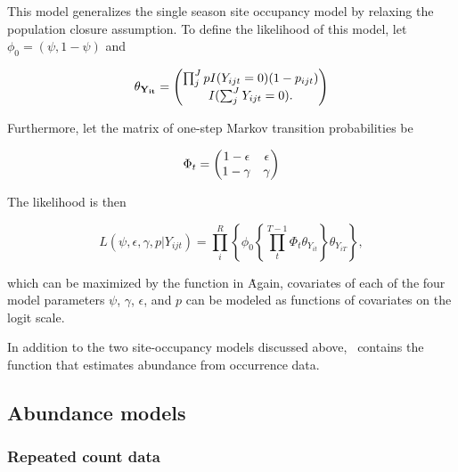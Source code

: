 \documentclass[article,shortnames]{jss}
\newcommand{\um}{\pkg{unmarked}}
\begin{document}
This model generalizes the single season site occupancy model by relaxing the 
population closure assumption. To define the likelihood of this model, 
let $\phi_0 = (\psi, 1-\psi)$ and 

\begin{equation}
  \theta_{{\bf Y_{it}}} =
  \begin{pmatrix}
    \prod_{j}^{J} p I(Y_{ijt}=0)(1-p_{ijt}) \\
    I(\sum_{j}^{J} Y_{ijt}=0). \notag\\
  \end{pmatrix}
\end{equation}

Furthermore, let  the matrix of one-step Markov transition probabilities be 

\begin{equation}
  \Phi_t =
  \begin{pmatrix}
    1-\epsilon & \epsilon \\
    1-\gamma & \gamma \notag\\
  \end{pmatrix}
\end{equation}

The likelihood is then

\begin{equation}
L(\psi,\epsilon,\gamma,p | Y_{ijt}) = 
 \prod_{i}^{R} \left\{
    \phi_0 \left\{ \prod_{t}^{T-1} \Phi_t \theta_{Y_{it}}  
        \right\} \theta_{Y_{iT}} \right\},
\end{equation}

which can be maximized by the  function in \um\. Again, 
covariates of each of the four model parameters $\psi$, $\gamma$, 
$\epsilon$, and $p$ can be modeled as functions of covariates on the logit 
scale. 

In addition to the two site-occupancy models discussed above, \um\ contains
the function  that estimates abundance from occurrence data. 

\subsection{Abundance models}

\subsubsection{Repeated count data}
\label{sec:repeated-count-data}
\end{document}
